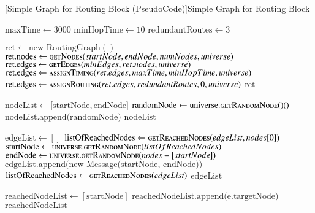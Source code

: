\begin{breakablealgorithm}
	[Simple Graph for Routing Block (PseudoCode)]{Simple Graph for Routing Block}\label{alg:simpleGraph}
	\begin{algorithmic}[1]
		\label{alg:getRoutingGraph-line}
		\State $\text{maxTime} \gets 3000$
		\State $\text{minHopTime} \gets 10$
		\State $\text{redundantRoutes} \gets 3$
		\item[]
		\State $\text{ret} \gets \text{new RoutingGraph}()$
		\State $\text{ret.nodes} \gets \Call{getNodes}{startNode, endNode, numNodes, universe}$
		\State $\text{ret.edges} \gets \Call{getEdges}{minEdges, ret.nodes, universe}$
		\State $\text{ret.edges} \gets \Call{assignTiming}{ret.edges, maxTime, minHopTime, universe}$
		\State $\text{ret.edges} \gets \Call{assignRouting}{ret.edges, redundantRoutes, 0, universe}$
		\Return $\text{ret}$	
		\EndFunction
		\item[]		
		\label{alg:getNodes-line}
		\State $\text{nodeList} \gets \lbrack\text{startNode}, \text{endNode}\rbrack$
		\State $\text{randomNode} \gets \text{universe}.\Call{getRandomNode()}$
		\State $\text{nodeList.append(randomNode)}$ 
		\EndIf	
		\EndWhile{}	
		\Return $\text{nodeList}$
		\EndFunction  
		\item[]
		\label{alg:getEdges-line}
		\State $\text{edgeList} \gets []$
		\State $\text{listOfReachedNodes} \gets \Call{getReachedNodes}{edgeList, nodes[0]}$
		\State $\text{startNode} \gets \Call{universe.getRandomNode}{listOfReachedNodes}$
		\State $\text{endNode} \gets \Call{universe.getRandomNode}{nodes-[startNode]}$
		\State $\text{edgeList.append(new Message(startNode, endNode))}$
		\State $\text{listOfReachedNodes} \gets \Call{getReachedNodes}{edgeList}$
		\EndWhile{}
		\Return $\text{edgeList}$
		\EndFunction
		\item[]
		\label{alg:getReachedNodes-line}
		\State $\text{reachedNodeList} \gets [\text{startNode}]$
		\State $\text{reachedNodeList.append(e.targetNode)}$
		\EndIf
		\EndFor
		\Return $\text{reachedNodeList}$
		\EndFunction
	\end{algorithmic}
\end{breakablealgorithm}

